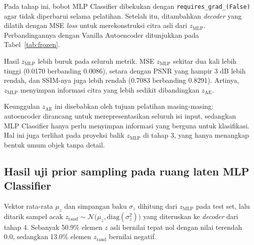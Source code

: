 \documentclass{article}
\begin{document}
Pada tahap ini, bobot MLP Classifier dibekukan dengan \texttt{requires\_grad\_(False)} agar tidak diperbarui selama pelatihan. Setelah itu, ditambahkan \textit{decoder} yang dilatih dengan MSE \textit{loss} untuk merekonstruksi citra asli dari $z_{\text{MLP}}$. Perbandingannya dengan Vanilla Autoencoder ditunjukkan pada Tabel~\ref{tab:frozen}.
\begin{table}[H]
    \centering
    \caption{Rekonstruksi test set dari laten beku $z_{\text{MLP}}$ dibandingkan Vanilla AE ($z_{\text{AE}} \in \mathbb{R}^{64}$)}
    \label{tab:frozen}
\end{table}

Hasil $z_{\text{MLP}}$ lebih buruk pada seluruh metrik. MSE $z_{\text{MLP}}$ sekitar dua kali lebih tinggi (0.0170 berbanding 0.0086), setara dengan PSNR yang hampir 3 dB lebih rendah, dan SSIM-nya juga lebih rendah (0.7083 berbanding 0.8291). Artinya, $z_{\text{MLP}}$ menyimpan informasi citra yang lebih sedikit dibandingkan $z_{\text{AE}}$.

Keunggulan $z_{\text{AE}}$ ini disebabkan oleh tujuan pelatihan masing-masing: autoencoder dirancang untuk merepresentasikan seluruh isi input, sedangkan MLP Classifier hanya perlu menyimpan informasi yang berguna untuk klasifikasi. Hal ini juga terlihat pada proyeksi balik $z_{\text{MLP}}$ di tahap 3, yang hanya menangkap bentuk umum objek tanpa detail.

\subsection{Hasil uji prior sampling pada ruang laten MLP Classifier}
\label{sec:prior}
Vektor rata-rata $\mu_z$ dan simpangan baku $\sigma_z$ dihitung dari $z_{\text{MLP}}$ pada test set, lalu ditarik sampel acak $z_{\text{rand}}\sim \mathcal{N}\big(\mu_z,\mathrm{diag}(\sigma^2_z)\big)$ yang diteruskan ke \textit{decoder} dari tahap 4. Sebanyak 50.9\% elemen $z$ asli bernilai tepat nol dengan nilai terendah 0.0, sedangkan 13.0\% elemen $z_{\text{rand}}$ bernilai negatif.
\end{document}
